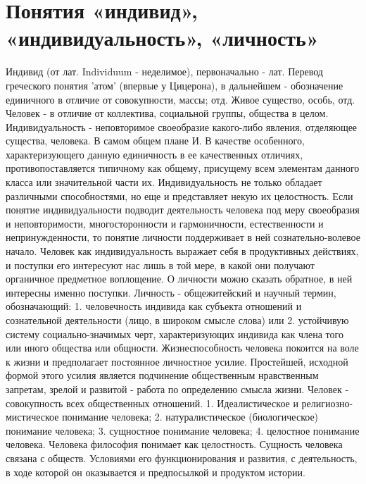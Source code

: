 \documentclass[12pt]{article}
\begin{document}
\section{Понятия «индивид», «индивидуальность», «личность»}
Индивид (от лат. Individuum - неделимое), первоначально - лат. Перевод греческого понятия 'атом' (впервые у
Цицерона), в дальнейшем - обозначение единичного в отличие от совокупности, массы; отд. Живое существо,
особь, отд. Человек - в отличие от коллектива, социальной группы, общества в целом.
Индивидуальность - неповторимое своеобразие какого-либо явления, отделяющее существа, человека. В самом
общем плане И. В качестве особенного, характеризующего данную единичность в ее качественных отличиях,
противопоставляется типичному как общему, присущему всем элементам данного класса или значительной
части их.
Индивидуальность  не  только  обладает  различными  способностями,  но  еще  и  представляет  некую  их
целостность.  Если  понятие  индивидуальности  подводит  деятельность  человека  под  меру  своеобразия  и
неповторимости,  многосторонности  и  гармоничности,  естественности  и  непринужденности,  то  понятие
личности поддерживает в ней сознательно-волевое начало. Человек как индивидуальность выражает себя в
продуктивных действиях, и поступки его интересуют нас лишь в той мере, в какой они получают органичное
предметное воплощение. О личности можно сказать обратное, в ней интересны именно поступки.
Личность - общежитейский и научный термин, обозначающий:
 1. человечность индивида как субъекта отношений и сознательной деятельности (лицо, в широком смысле
слова) или
  2. устойчивую систему социально-значимых черт, характеризующих индивида как члена того или иного
общества или общности. 
Жизнеспособность  человека  покоится  на  воле  к  жизни  и  предполагает  постоянное  личностное  усилие.
Простейшей,  исходной  формой  этого  усилия  является  подчинение  общественным  нравственным  запретам,
зрелой и развитой - работа по определению смысла жизни.
Человек - совокупность всех общественных отношений.
1. Идеалистическое и религиозно-мистическое понимание человека;
2. натуралистическое (биологическое) понимание человека;
3. сущностное понимание человека;
4. целостное понимание человека. 
Человека  философия  понимает  как  целостность.  Сущность  человека  связана  с  обществ.  Условиями  его
функционирования и развития, с деятельность, в ходе которой он оказывается и предпосылкой и продуктом
истории. 


\newpage
\end{document}
